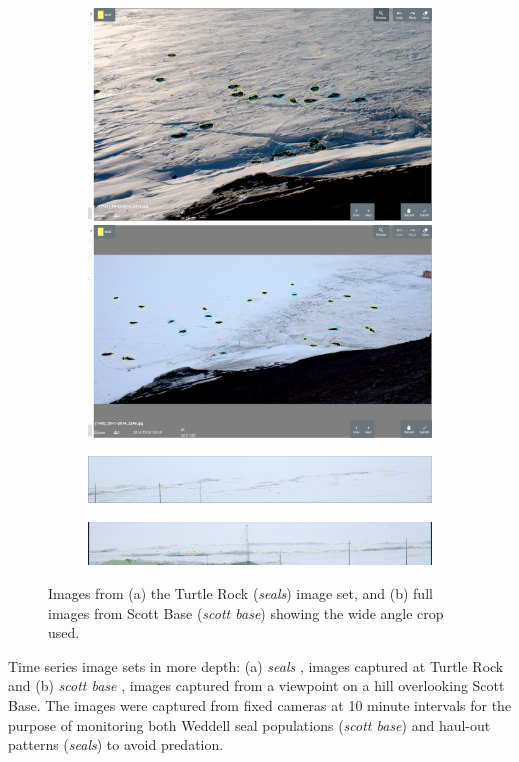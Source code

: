 \begin{figure}[ht!]
\centering
\begin{subfigure}[t]{1.0\linewidth}
  \includegraphics[width=0.475\linewidth]{figures/annotation/screenshots/seals_small2.png}
  \hfill
  \includegraphics[width=0.475\linewidth]{figures/annotation/screenshots/seals_small.png}
  \caption{}
\end{subfigure}

\begin{subfigure}[t]{1.0\linewidth}
  \includegraphics[width=1.0\linewidth]{figures/annotation/screenshots/cam_c.png}
\end{subfigure}

\begin{subfigure}[t]{1.0\linewidth}
  \includegraphics[width=1.0\linewidth]{figures/annotation/screenshots/cam_b.png}
  \caption{}
\end{subfigure}


\caption{ Images from (a) the Turtle Rock (\emph{seals}) image set, and (b) full images from Scott Base (\emph{scott base}) showing the wide angle crop used.  }
\label {fig:weddell_images}
\end{figure}


Time series image sets in more depth: (a) \emph{seals}  \cite{Eisert2015}, images captured at Turtle Rock and (b) \emph{scott base}  \cite{Eisert2019}, images captured from a viewpoint on a hill overlooking Scott Base. The images were captured from fixed cameras at 10 minute intervals for the purpose of monitoring both Weddell seal populations (\emph{scott base}) and haul-out patterns (\emph{seals}) to avoid predation. 

